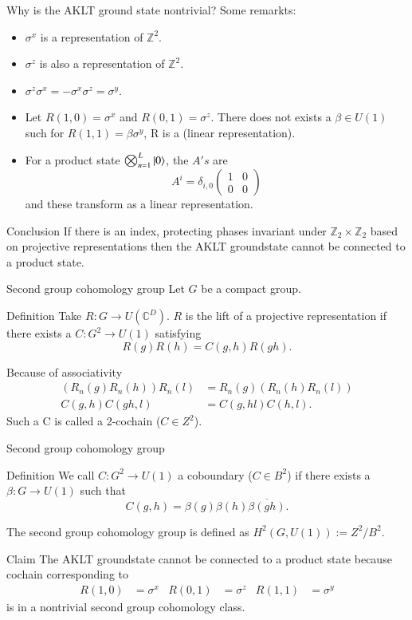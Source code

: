 \documentclass{beamer}
\newcommand{\CC}{\mathbb{C}}
\newcommand{\ZZ}{\mathbb{Z}}
\begin{document}
\begin{frame}{Why is the AKLT ground state nontrivial?}
Some remarkts:
\begin{itemize}
\item $\sigma^x$ is a representation of $\ZZ^2$.
\pause
\item $\sigma^z$ is also a representation of $\ZZ^2$.
\pause
\item $\sigma^z\sigma^x=-\sigma^x\sigma^z=\sigma^y$.
\pause
\item Let $R(1,0)=\sigma^x$ and $R(0,1)=\sigma^z$. There does not exists a $\beta\in U(1)$ such for $R(1,1)=\beta \sigma^y$, R is a (linear representation).
\pause
\item For a product state $\bigotimes_{n=1}^L\ket{0}$, the $A's$ are
\[A^i=\delta_{i,0}\begin{pmatrix}1&0\\0&0\end{pmatrix}\]
and these transform as a linear representation.
\end{itemize}
\pause
\begin{block}{Conclusion}
If there is an index, protecting phases invariant under $\ZZ_2\times\ZZ_2$ based on projective representations then the AKLT groundstate cannot be connected to a product state.
\end{block}
\end{frame}

\begin{frame}{Second group cohomology group}
Let $G$ be a compact group.
\begin{block}{Definition}
Take $R:G\rightarrow U(\CC^D)$. $R$ is the lift of a projective representation if there exists a $C:G^2\rightarrow U(1)$ satisfying
\[R(g)R(h)=C(g,h)R(gh).\]
\end{block}
\pause
Because of associativity
\begin{align*}
(R_n(g)R_n(h))R_n(l)&=R_n(g)(R_n(h)R_n(l))\\
C(g,h)C(gh,l)&=C(g,hl)C(h,l).
\end{align*}
Such a C is called a 2-cochain ($C\in Z^2$).
\end{frame}

\begin{frame}{Second group cohomology group}
\begin{block}{Definition}
We call $C:G^2\rightarrow U(1)$ a coboundary ($C\in B^2$) if there exists a $\beta:G\rightarrow U(1)$ such that
\[C(g,h)=\beta(g)\beta(h)\overline{\beta(gh)}.\]
\end{block}
The second group cohomology group is defined as $H^2(G,U(1)):=Z^2/B^2$.
\pause
\begin{block}{Claim}
The AKLT groundstate cannot be connected to a product state because cochain corresponding to
\begin{align*}
R(1,0)&=\sigma^x&R(0,1)&=\sigma^z&R(1,1)&=\sigma^y
\end{align*}
is in a nontrivial second group cohomology class.
\end{block}
\end{frame}
\end{document}
